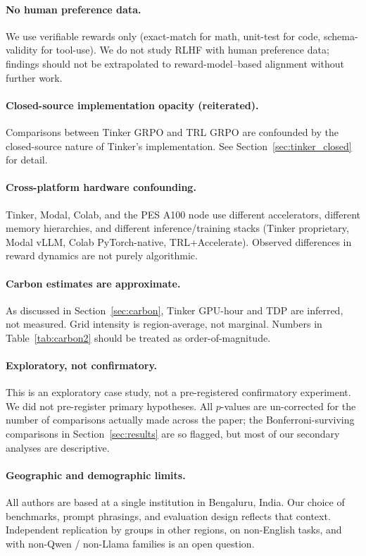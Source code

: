 \paragraph{No human preference data.}
We use verifiable rewards only (exact-match for math, unit-test for code,
schema-validity for tool-use). We do not study RLHF with human preference
data; findings should not be extrapolated to reward-model--based alignment
without further work.

\paragraph{Closed-source implementation opacity (reiterated).}
Comparisons between Tinker GRPO and TRL GRPO are confounded by the
closed-source nature of Tinker's implementation. See
Section~\ref{sec:tinker_closed} for detail.

\paragraph{Cross-platform hardware confounding.}
Tinker, Modal, Colab, and the PES A100 node use different accelerators,
different memory hierarchies, and different inference/training stacks
(Tinker proprietary, Modal vLLM, Colab PyTorch-native, TRL+Accelerate).
Observed differences in reward dynamics are not purely algorithmic.

\paragraph{Carbon estimates are approximate.}
As discussed in Section~\ref{sec:carbon}, Tinker GPU-hour and TDP are
inferred, not measured. Grid intensity is region-average, not marginal.
Numbers in Table~\ref{tab:carbon2} should be treated as
order-of-magnitude.

\paragraph{Exploratory, not confirmatory.}
This is an exploratory case study, not a pre-registered confirmatory
experiment. We did not pre-register primary hypotheses. All $p$-values are
un-corrected for the number of comparisons actually made across the
paper; the Bonferroni-surviving comparisons in
Section~\ref{sec:results} are so flagged, but most of our secondary
analyses are descriptive.

\paragraph{Geographic and demographic limits.}
All authors are based at a single institution in Bengaluru, India. Our
choice of benchmarks, prompt phrasings, and evaluation design reflects
that context. Independent replication by groups in other regions, on
non-English tasks, and with non-Qwen / non-Llama families is an open
question.


